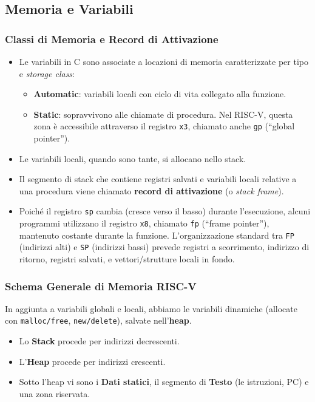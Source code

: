 \documentclass[12pt, a4paper]{article}
\begin{document}
\subsection{Memoria e Variabili}

\subsubsection{Classi di Memoria e Record di Attivazione}
\begin{itemize}
    \item Le variabili in C sono associate a locazioni di memoria caratterizzate per tipo e \textit{storage class}:
    \begin{itemize}
        \item \textbf{Automatic}: variabili locali con ciclo di vita collegato alla funzione.
        \item \textbf{Static}: sopravvivono alle chiamate di procedura. Nel RISC-V, questa zona è accessibile attraverso il registro \texttt{x3}, chiamato anche \texttt{gp} (``global pointer'').
    \end{itemize}
    \item Le variabili locali, quando sono tante, si allocano nello stack.
    \item Il segmento di stack che contiene registri salvati e variabili locali relative a una procedura viene chiamato \textbf{record di attivazione} (o \textit{stack frame}).
    \item Poiché il registro \texttt{sp} cambia (cresce verso il basso) durante l'esecuzione, alcuni programmi utilizzano il registro \texttt{x8}, chiamato \texttt{fp} (``frame pointer''), mantenuto costante durante la funzione. L'organizzazione standard tra \texttt{FP} (indirizzi alti) e \texttt{SP} (indirizzi bassi) prevede registri a scorrimento, indirizzo di ritorno, registri salvati, e vettori/strutture locali in fondo.
\end{itemize}

\subsubsection{Schema Generale di Memoria RISC-V}
In aggiunta a variabili globali e locali, abbiamo le variabili dinamiche (allocate con \texttt{malloc/free}, \texttt{new/delete}), salvate nell'\textbf{heap}.
\begin{itemize}
    \item Lo \textbf{Stack} procede per indirizzi decrescenti.
    \item L'\textbf{Heap} procede per indirizzi crescenti.
    \item Sotto l'heap vi sono i \textbf{Dati statici}, il segmento di \textbf{Testo} (le istruzioni, PC) e una zona riservata.
\end{itemize}
\end{document}
